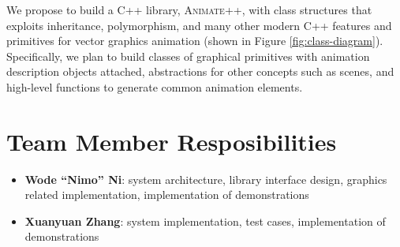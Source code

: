 \documentclass[10pt, nocopyrightspace, numbers]{assets/sigplanconf}
\begin{document}
We propose to build a C++ library, \textsc{Animate++}, with class structures that exploits inheritance, polymorphism, and many other modern C++ features and primitives for vector graphics animation (shown in Figure \ref{fig:class-diagram}). Specifically, we plan to build classes of graphical primitives with animation description objects attached, abstractions for other concepts such as scenes, and high-level functions to generate common animation elements.

\section{Team Member Resposibilities}

\begin{itemize}
    \item
    \textbf{Wode ``Nimo'' Ni}: system architecture, library interface design, graphics related implementation, implementation of demonstrations
    \item
    \textbf{Xuanyuan Zhang}: system implementation, test cases, implementation of demonstrations
\end{itemize}




\FloatBarrier %



\end{document}
